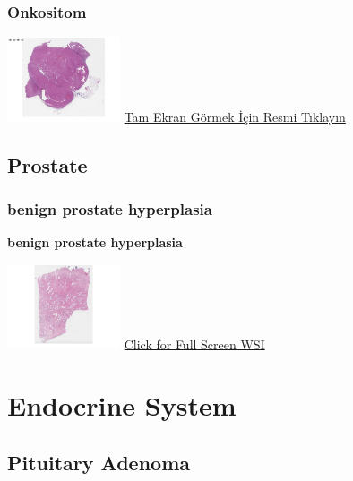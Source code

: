 \documentclass[
  letterpaper,
  paper=6in:9in,
  pagesize=pdftex,
  headinclude=on,
  footinclude=on,
  12pt]{scrbook}
\begin{document}
\hypertarget{sec-bobrek-onkositom}{%
\section{Onkositom}\label{sec-bobrek-onkositom}}

\href{https://images.patolojiatlasi.com/kidneyoncocytoma/HE.html}{\includegraphics[width=0.25\textwidth,height=\textheight]{./screenshots/kidneyoncocytoma_screenshot.png}}
\href{https://images.patolojiatlasi.com/kidneyoncocytoma/HE.html}{Tam
Ekran Görmek İçin Resmi Tıklayın}

\hypertarget{sec-prostate}{%
\chapter{Prostate}\label{sec-prostate}}

\hypertarget{sec-benign-prostate-hyperplasia}{%
\section{benign prostate
hyperplasia}\label{sec-benign-prostate-hyperplasia}}

\textbf{benign prostate hyperplasia}

\href{https://images.patolojiatlasi.com/benign-prostate-hyperplasia/HE.html}{\includegraphics[width=0.25\textwidth,height=\textheight]{./screenshots/benign-prostate-hyperplasia_screenshot.png}}
\href{https://images.patolojiatlasi.com/benign-prostate-hyperplasia/HE.html}{Click
for Full Screen WSI}

\part{Endocrine System}

\hypertarget{sec-pituitary-adenoma}{%
\chapter{Pituitary Adenoma}\label{sec-pituitary-adenoma}}
\end{document}
